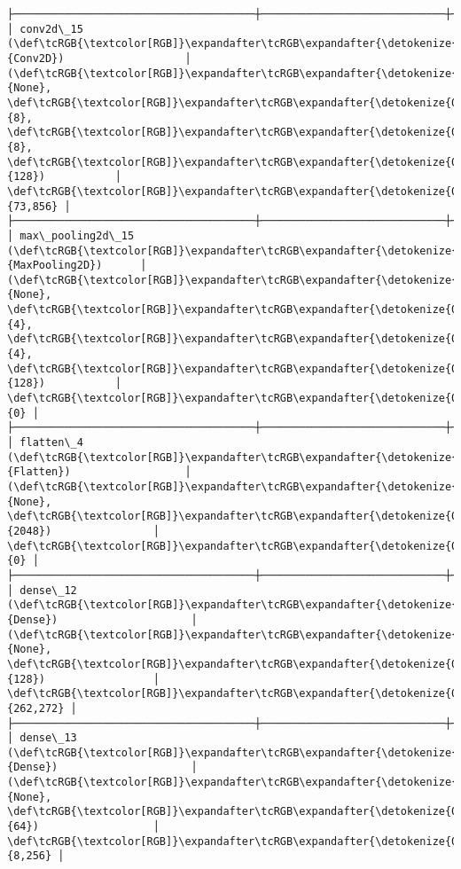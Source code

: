 \documentclass[11pt]{article}
\begin{document}
\begin{Verbatim}[commandchars=\\\{\}]
├──────────────────────────────────────┼─────────────────────────────┼─────────────────┤
│ conv2d\_15 (\def\tcRGB{\textcolor[RGB]}\expandafter\tcRGB\expandafter{\detokenize{0,135,255}}{Conv2D})                   │ (\def\tcRGB{\textcolor[RGB]}\expandafter\tcRGB\expandafter{\detokenize{0,215,255}}{None}, \def\tcRGB{\textcolor[RGB]}\expandafter\tcRGB\expandafter{\detokenize{0,175,0}}{8}, \def\tcRGB{\textcolor[RGB]}\expandafter\tcRGB\expandafter{\detokenize{0,175,0}}{8}, \def\tcRGB{\textcolor[RGB]}\expandafter\tcRGB\expandafter{\detokenize{0,175,0}}{128})           │          \def\tcRGB{\textcolor[RGB]}\expandafter\tcRGB\expandafter{\detokenize{0,175,0}}{73,856} │
├──────────────────────────────────────┼─────────────────────────────┼─────────────────┤
│ max\_pooling2d\_15 (\def\tcRGB{\textcolor[RGB]}\expandafter\tcRGB\expandafter{\detokenize{0,135,255}}{MaxPooling2D})      │ (\def\tcRGB{\textcolor[RGB]}\expandafter\tcRGB\expandafter{\detokenize{0,215,255}}{None}, \def\tcRGB{\textcolor[RGB]}\expandafter\tcRGB\expandafter{\detokenize{0,175,0}}{4}, \def\tcRGB{\textcolor[RGB]}\expandafter\tcRGB\expandafter{\detokenize{0,175,0}}{4}, \def\tcRGB{\textcolor[RGB]}\expandafter\tcRGB\expandafter{\detokenize{0,175,0}}{128})           │               \def\tcRGB{\textcolor[RGB]}\expandafter\tcRGB\expandafter{\detokenize{0,175,0}}{0} │
├──────────────────────────────────────┼─────────────────────────────┼─────────────────┤
│ flatten\_4 (\def\tcRGB{\textcolor[RGB]}\expandafter\tcRGB\expandafter{\detokenize{0,135,255}}{Flatten})                  │ (\def\tcRGB{\textcolor[RGB]}\expandafter\tcRGB\expandafter{\detokenize{0,215,255}}{None}, \def\tcRGB{\textcolor[RGB]}\expandafter\tcRGB\expandafter{\detokenize{0,175,0}}{2048})                │               \def\tcRGB{\textcolor[RGB]}\expandafter\tcRGB\expandafter{\detokenize{0,175,0}}{0} │
├──────────────────────────────────────┼─────────────────────────────┼─────────────────┤
│ dense\_12 (\def\tcRGB{\textcolor[RGB]}\expandafter\tcRGB\expandafter{\detokenize{0,135,255}}{Dense})                     │ (\def\tcRGB{\textcolor[RGB]}\expandafter\tcRGB\expandafter{\detokenize{0,215,255}}{None}, \def\tcRGB{\textcolor[RGB]}\expandafter\tcRGB\expandafter{\detokenize{0,175,0}}{128})                 │         \def\tcRGB{\textcolor[RGB]}\expandafter\tcRGB\expandafter{\detokenize{0,175,0}}{262,272} │
├──────────────────────────────────────┼─────────────────────────────┼─────────────────┤
│ dense\_13 (\def\tcRGB{\textcolor[RGB]}\expandafter\tcRGB\expandafter{\detokenize{0,135,255}}{Dense})                     │ (\def\tcRGB{\textcolor[RGB]}\expandafter\tcRGB\expandafter{\detokenize{0,215,255}}{None}, \def\tcRGB{\textcolor[RGB]}\expandafter\tcRGB\expandafter{\detokenize{0,175,0}}{64})                  │           \def\tcRGB{\textcolor[RGB]}\expandafter\tcRGB\expandafter{\detokenize{0,175,0}}{8,256} │

\end{Verbatim}
\end{document}
